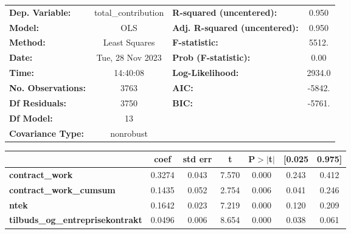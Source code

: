 \begin{center}
\begin{tabular}{lclc}
\toprule
\textbf{Dep. Variable:}                  & total\_contribution & \textbf{  R-squared (uncentered):}      &     0.950   \\
\textbf{Model:}                          &         OLS         & \textbf{  Adj. R-squared (uncentered):} &     0.950   \\
\textbf{Method:}                         &    Least Squares    & \textbf{  F-statistic:       }          &     5512.   \\
\textbf{Date:}                           &   Tue, 28 Nov 2023  & \textbf{  Prob (F-statistic):}          &     0.00    \\
\textbf{Time:}                           &       14:40:08      & \textbf{  Log-Likelihood:    }          &    2934.0   \\
\textbf{No. Observations:}               &          3763       & \textbf{  AIC:               }          &    -5842.   \\
\textbf{Df Residuals:}                   &          3750       & \textbf{  BIC:               }          &    -5761.   \\
\textbf{Df Model:}                       &            13       & \textbf{                     }          &             \\
\textbf{Covariance Type:}                &      nonrobust      & \textbf{                     }          &             \\
\bottomrule
\end{tabular}
\begin{tabular}{lcccccc}
                                         & \textbf{coef} & \textbf{std err} & \textbf{t} & \textbf{P$> |$t$|$} & \textbf{[0.025} & \textbf{0.975]}  \\
\midrule
\textbf{contract\_work}                  &       0.3274  &        0.043     &     7.570  &         0.000        &        0.243    &        0.412     \\
\textbf{contract\_work\_cumsum}          &       0.1435  &        0.052     &     2.754  &         0.006        &        0.041    &        0.246     \\
\textbf{ntek}                            &       0.1642  &        0.023     &     7.219  &         0.000        &        0.120    &        0.209     \\
\textbf{tilbuds\_og\_entreprisekontrakt} &       0.0496  &        0.006     &     8.654  &         0.000        &        0.038    &        0.061     \\

\end{tabular}
\end{center}
